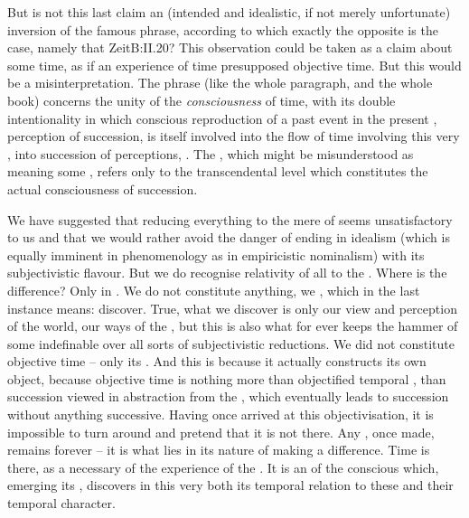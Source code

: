 \pa But is not this last claim an (intended and idealistic, if not merely
unfortunate) inversion of the famous phrase, according to which exactly the
opposite is the case, namely that \citet{perception of succession presupposes
  succession of perceptions}{Zeit}{B:II.20}?  This observation could be taken as
a claim about some  time, as if an experience of time presupposed
objective time.  But this would be a misinterpretation. The phrase (like the
whole paragraph, and the whole book) concerns the unity of the {\em
  consciousness} of time, with its double intentionality in which conscious
reproduction of a past event in the present , perception of succession,
is itself involved into the flow of time involving this very , into
succession of perceptions, . The
, which might be misunderstood as meaning some
, refers only to the transcendental level which
constitutes the actual consciousness of succession.



We have suggested that reducing everything to the mere  of
 seems unsatisfactory to us and that we would rather avoid
the danger of ending in idealism (which is equally imminent in phenomenology as
in empiricistic nominalism) with its subjectivistic flavour. But we do recognise
relativity of all  to the . Where is the
difference? Only in . We do not constitute anything, we
, which in the last instance means: discover. True, what we
discover is only our view and perception of the world, our ways of
 the , but this is also what for ever keeps
the hammer of some indefinable  over all sorts of
subjectivistic reductions.  We did not constitute {objective} time -- only its
. And this  is  because it
actually constructs its own object, because objective time is nothing more than
objectified temporal , than succession viewed in abstraction from
the , which eventually leads to succession without
anything successive. Having once arrived at this objectivisation,
it is impossible to turn around and pretend that it is not there. Any
, once made, remains forever -- it is what lies in its nature of
making a difference. Time is there, as a necessary  of the experience
of the . It is an  of the conscious 
which, emerging  its , discovers in this very
 both its temporal relation to these  and their temporal
character.

